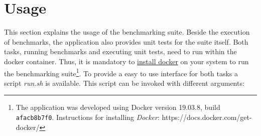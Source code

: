 \section{Usage}\label{sec:benchmarks_usage}
This section explains the usage of the benchmarking suite. Beside the execution of benchmarks, the application also provides unit tests for the suite itself. Both tasks, running benchmarks and executing unit tests, need to run within the docker container. Thus, it is mandatory to \href{https://docs.docker.com/get-docker/}{install docker} on your system to run the benchmarking suite\footnote{The application was developed using Docker version 19.03.8, build \texttt{afacb8b7f0}. Instructions for installing \textit{Docker}: https://docs.docker.com/get-docker/}.
To provide a easy to use interface for both tasks a script \textit{run.sh} is available. This script can be invoked with different arguments:
